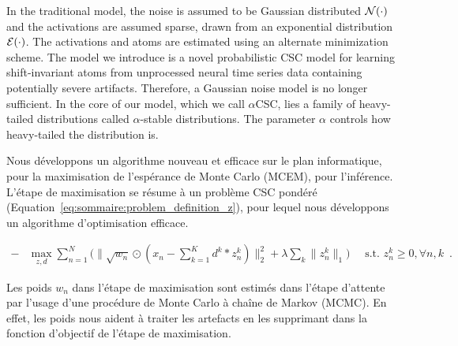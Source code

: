 In the traditional model, the noise is assumed to be Gaussian distributed $\cal N(\cdot)$ and the activations are assumed sparse, drawn from an exponential distribution $\cal E(\cdot)$. The activations and atoms are estimated using an alternate minimization scheme. The model we introduce is a novel probabilistic \ac{CSC} model for learning shift-invariant atoms from unprocessed neural time series data containing potentially severe artifacts. Therefore, a Gaussian noise model is no longer sufficient. In the core of our model, which we call $\alpha$CSC, lies a family of heavy-tailed
distributions called $\alpha$-stable distributions. The parameter $\alpha$ controls how heavy-tailed the distribution is.

Nous développons un algorithme nouveau et efficace sur le plan informatique, pour la maximisation de l'espérance de Monte Carlo (MCEM), pour l'inférence. L'étape de maximisation se résume à un problème CSC pondéré (Equation~\ref{eq:sommaire:problem_definition_z}), pour lequel nous développons un algorithme d'optimisation efficace.

\begin{align}
- & \max_{z, d} \sum_{n=1}^{N} \Big( \|\sqrt{w_{n}} \odot (x_{n} - \sum_{k=1}^{K}d^{k} * z_{n}^{k})\|_{2}^{2} + \lambda \sum_{k}{ \|{z}_{n}^{k} \|_1}\Big) \quad \text{ s.t.  } {z}_n^k \geq 0, \forall n,k\enspace .
\label{eq:sommaire:problem_definition_z}
\end{align} 

Les poids $w_n$ dans l'étape de maximisation sont estimés dans l'étape d'attente par l’usage d'une procédure de Monte Carlo à chaîne de Markov (MCMC). En effet, les poids nous aident à traiter les artefacts en les supprimant dans la fonction d'objectif de l'étape de maximisation.

